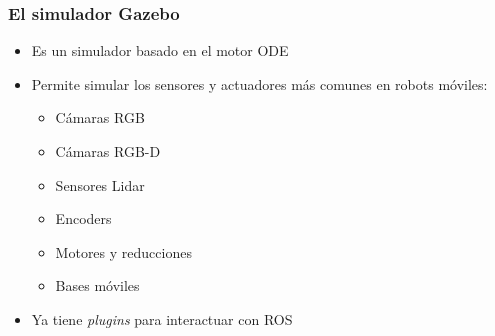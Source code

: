 \begin{frame}\frametitle{El simulador Gazebo}
  \begin{itemize}
  \item Es un simulador basado en el motor ODE
  \item Permite simular los sensores y actuadores más comunes en robots móviles:
    \begin{itemize}
    \item Cámaras RGB 
    \item Cámaras RGB-D
    \item Sensores Lidar
    \item Encoders
    \item Motores y reducciones
    \item Bases móviles 
    \end{itemize}
  \item Ya tiene \textit{plugins} para interactuar con ROS
  \end{itemize}
\end{frame}

